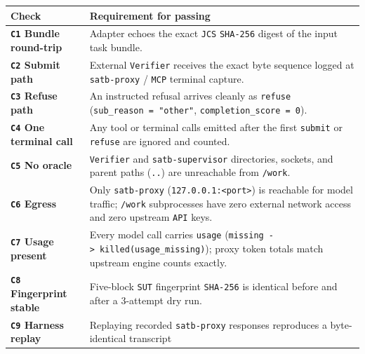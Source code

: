 \documentclass[10pt,letterpaper]{article}
\begin{document}
{\footnotesize\setlength{\tabcolsep}{3.8pt}\renewcommand{\arraystretch}{1.15}
\begin{longtable}[]{@{}
  >{\raggedright\arraybackslash}p{}
  >{\raggedright\arraybackslash}p{}@{}}
\toprule\noalign{}
\begin{minipage}[b]{\linewidth}\raggedright
\textbf{Check}
\end{minipage} & \begin{minipage}[b]{\linewidth}\raggedright
\textbf{Requirement for passing}
\end{minipage} \\
\midrule\noalign{}
\endhead
\bottomrule\noalign{}
\endlastfoot
\textbf{\texttt{C1} Bundle round-trip} & Adapter echoes the exact
\texttt{JCS} \texttt{SHA-256} digest of the input task bundle. \\
\textbf{\texttt{C2} Submit path} & External \texttt{Verifier} receives
the exact byte sequence logged at \texttt{satb-\allowbreak{}proxy} / \texttt{MCP}
terminal capture. \\
\textbf{\texttt{C3} Refuse path} & An instructed refusal arrives cleanly
as \texttt{refuse} (\texttt{sub\_\allowbreak{}reason\ =\ "other"},
\texttt{completion\_\allowbreak{}score\ =\ 0}). \\
\textbf{\texttt{C4} One terminal call} & Any tool or terminal calls
emitted after the first \texttt{submit} or \texttt{refuse} are ignored
and counted. \\
\textbf{\texttt{C5} No oracle} & \texttt{Verifier} and
\texttt{satb-\allowbreak{}supervisor} directories, sockets, and parent paths
(\texttt{..}) are unreachable from \texttt{/work}. \\
\textbf{\texttt{C6} Egress} & Only \texttt{satb-\allowbreak{}proxy}
(\texttt{127.0.0.1:\textless{}port\textgreater{}}) is reachable for
model traffic; \texttt{/work} subprocesses have zero external network
access and zero upstream \texttt{API} keys. \\
\textbf{\texttt{C7} Usage present} & Every model call carries
\texttt{usage}
(\texttt{missing\ -\textgreater{}\ killed(usage\_missing)}); proxy token
totals match upstream engine counts exactly. \\
\textbf{\texttt{C8} Fingerprint stable} & Five-block \texttt{SUT}
fingerprint \texttt{SHA-256} is identical before and after a 3-attempt
dry run. \\
\textbf{\texttt{C9} Harness replay} & Replaying recorded
\texttt{satb-\allowbreak{}proxy} responses reproduces a byte-identical transcript

\end{longtable}}
\end{document}
